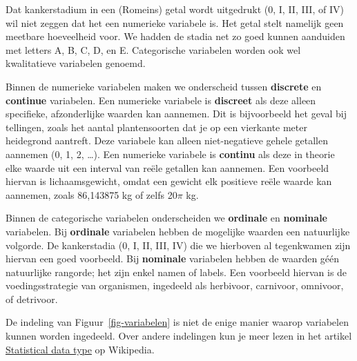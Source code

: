 \documentclass[
  a4paper,
]{scrbook}
\theoremstyle{definition}
\theoremstyle{definition}
\theoremstyle{remark}
\begin{document}
\begin{tcolorbox}[enhanced jigsaw, arc=.35mm, bottomrule=.15mm, colframe=quarto-callout-warning-color-frame, colback=white, bottomtitle=1mm, colbacktitle=quarto-callout-warning-color!10!white, left=2mm, titlerule=0mm, coltitle=black, opacitybacktitle=0.6, breakable, toptitle=1mm, title=\textcolor{quarto-callout-warning-color}{\faExclamationTriangle}\hspace{0.5em}{Niet alle getallen zijn numeriek}, opacityback=0, toprule=.15mm, leftrule=.75mm, rightrule=.15mm]

Dat kankerstadium in een (Romeins) getal wordt uitgedrukt (0, I, II,
III, of IV) wil niet zeggen dat het een numerieke variabele is. Het
getal stelt namelijk geen meetbare hoeveelheid voor. We hadden de stadia
net zo goed kunnen aanduiden met letters A, B, C, D, en E. Categorische
variabelen worden ook wel kwalitatieve variabelen genoemd.

\end{tcolorbox}

Binnen de numerieke variabelen maken we onderscheid tussen
\textbf{discrete} en \textbf{continue} variabelen. Een numerieke
variabele is \textbf{discreet} als deze alleen specifieke, afzonderlijke
waarden kan aannemen. Dit is bijvoorbeeld het geval bij tellingen, zoals
het aantal plantensoorten dat je op een vierkante meter heidegrond
aantreft. Deze variabele kan alleen niet-negatieve gehele getallen
aannemen (0, 1, 2, \ldots). Een numerieke variabele is \textbf{continu}
als deze in theorie elke waarde uit een interval van reële getallen kan
aannemen. Een voorbeeld hiervan is lichaamsgewicht, omdat een gewicht
elk positieve reële waarde kan aannemen, zoals 86,143875 kg of zelfs
20\(\pi\) kg.

Binnen de categorische variabelen onderscheiden we \textbf{ordinale} en
\textbf{nominale} variabelen. Bij \textbf{ordinale} variabelen hebben de
mogelijke waarden een natuurlijke volgorde. De kankerstadia (0, I, II,
III, IV) die we hierboven al tegenkwamen zijn hiervan een goed
voorbeeld. Bij \textbf{nominale} variabelen hebben de waarden géén
natuurlijke rangorde; het zijn enkel namen of labels. Een voorbeeld
hiervan is de voedingsstrategie van organismen, ingedeeld als herbivoor,
carnivoor, omnivoor, of detrivoor.

De indeling van Figuur~\ref{fig-variabelen} is niet de enige manier
waarop variabelen kunnen worden ingedeeld. Over andere indelingen kun je
meer lezen in het artikel
\href{https://en.wikipedia.org/wiki/Statistical_data_type}{Statistical
data type} op Wikipedia.
\end{document}
